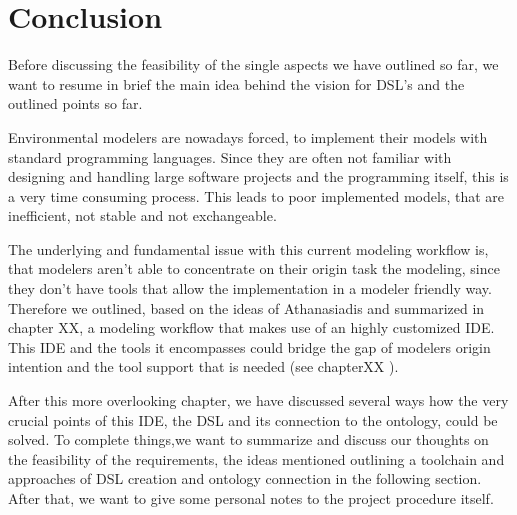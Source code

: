 \chapter{Conclusion}
\par
Before discussing the feasibility of the single aspects we have outlined so far, we want to resume in brief the main idea behind the vision for DSL’s and the outlined points so far.
\par
Environmental modelers are nowadays forced, to implement their models with standard programming languages. Since they are often not familiar with designing and handling large software projects and the programming itself, this is a very time consuming process. This leads to poor implemented models, that are inefficient, not stable and not exchangeable.
\par
The underlying and fundamental issue with this current modeling workflow is, that modelers aren’t able to concentrate on their origin task the modeling, since they don't have tools that allow the implementation in a modeler friendly way. Therefore we outlined, based on the ideas of Athanasiadis and summarized in 
 chapter XX, a modeling workflow that makes use of an highly customized IDE. This IDE and the tools it encompasses could bridge the gap of modelers origin intention and the tool support that is needed (see chapterXX ).
\par
After this more overlooking chapter, we have discussed several ways how the very crucial points of this IDE, the DSL and its connection to the ontology, could be solved. To complete things,we want to summarize and discuss our thoughts on the feasibility of the requirements, the ideas mentioned outlining a toolchain and approaches of DSL creation and ontology connection in the following section. After that, we want to give some personal notes to the project procedure itself. 
